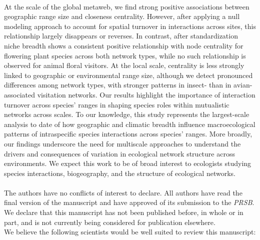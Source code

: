 \documentclass{article}
\begin{document}
\paragraph*{} At the scale of the global metaweb, we find strong positive associations between geographic range size and closeness centrality. However, after applying a null modeling approach to account for spatial turnover in interactions across sites, this relationship largely disappears or reverses. In contrast, after standardization niche breadth shows a consistent positive relationship with node centrality for flowering plant species across both network types, while no such relationship is observed for animal floral visitors. At the local scale, centrality is less strongly linked to geographic or environmental range size, although we detect pronounced differences among network types, with stronger patterns in insect- than in avian-associated visitation networks. Our results highlight the importance of interaction turnover across species’ ranges in shaping species roles within mutualistic networks across scales. To our knowledge, this study represents the largest-scale analysis to date of how geographic and climatic breadth influence macroecological patterns of intraspecific species interactions across species' ranges. More broadly, our findings underscore the need for multiscale approaches to understand the drivers and consequences of variation in ecological network structure across environments. We expect this work to be of broad interest to ecologists studying species interactions, biogeography, and the structure of ecological networks.

\paragraph*{}The authors have no conflicts of interest to declare. All authors have read the final version of the manuscript and have approved of its submission to the \emph{PRSB}. We declare that this manuscript has not been published before, in whole or in part, and is not currently being considered for publication elsewhere. \\

\newpage
We believe the following scientists would be well suited to review this manuscript: 
\end{document}
